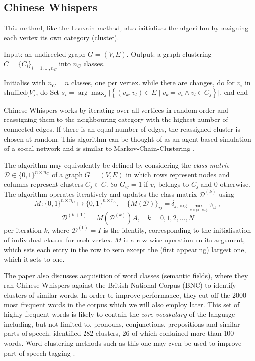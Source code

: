 \documentclass{prettytex/ox/mmsc-special-topic}
\begin{document}
  \subsection{Chinese Whispers}
  \label{sec:cw}
  This method, like the Louvain method, also initialises the algorithm by assigning each vertex its own category (cluster).

  \begin{algorithm}[language=pseudo, caption={\centering The \textit{Chinese Whispers} algorithm due to \cite{cw-biemann}}]
Input: an undirected graph $G = (V, E)$.
Output: a graph clustering $C = \{C_i\}_{i=1, ..., n_C}$ into $n_C$ classes.

Initialise with $n_C = n$ classes, one per vertex.
while there are changes, do
  for $v_i$ in shuffled($V$), do
    Set $s_i = \arg\max_{j} \big|\left\{(v_k, v_l) \in E \;|\; v_k = v_i \wedge v_l \in C_j\right\}\big|$.
  end
end
  \end{algorithm}

  Chinese Whispers works by iterating over all vertices in random order and reassigning them to the neighbouring category with the highest number of connected edges. If there is an equal number of edges, the reassigned cluster is chosen at random.
  This algorithm can be thought of as an agent-based simulation of a social network \parencite{cw-biemann} and is similar to Markov-Chain-Clustering \parencite{van-dongen, fortunato}.

  The algorithm may equivalently be defined by considering the \textit{class matrix} $\mathcal{D} \in \{0, 1\}^{n \times n_C}$ of a graph $G = (V, E)$ in which rows represent nodes and columns represent clusters $C_j \in C$.
  So $G_{ij} = 1$ if $v_i$ belongs to $C_j$ and $0$ otherwise.
  The algorithm operates iteratively and updates the class matrix $\mathcal{D}^{(k)}$ using
  $$M: \{0, 1\}^{n \times n_C} \mapsto \{0, 1\}^{n \times n_C}, \quad \{M(\mathcal{D})\}_{ij} = \delta_{j,\arg\max_{k\in \{0...n_C\}} \mathcal{D}_{ik}}\,,$$
  $$\mathcal{D}^{(k+1)} = M(\mathcal{D}^{(k)}) A, \quad k = 0, 1, 2, ..., N$$
  per iteration $k$, where $\mathcal{D}^{(0)} = I$ is the identity, corresponding to the initialisation of individual classes for each vertex.
  $M$ is a row-wise operation on its argument, which sets each entry in the row to zero except the (first appearing) largest one, which it sets to one.

  The paper also discusses acquisition of word classes (semantic fields), where they ran Chinese Whispers against the British National Corpus (BNC) to identify clusters of similar words.
  In order to improve performance, they cut off the 2000 most frequent words in the corpus which we will also employ later.
  This set of highly frequent words is likely to contain the \textit{core vocabulary} of the language including, but not limited to, pronouns, conjunctions, prepositions and similar parts of speech.
  \cite{cw-biemann} identified 282 clusters, 26 of which contained more than 100 words.
  Word clustering methods such as this one may even be used to improve part-of-speech tagging \parencite{ushioda-improved-pos-tagging}.
\end{document}

